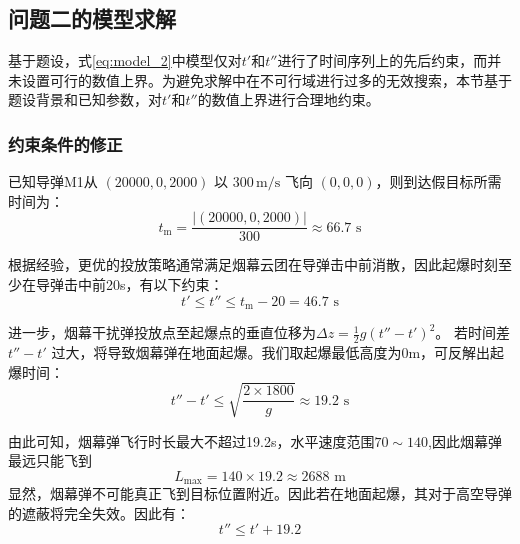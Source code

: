 \documentclass[withoutpreface,bwprint]{cumcmthesis}
\numberwithin{equation}{section} %
\numberwithin{figure}{section} %
\numberwithin{table}{section}  %
\begin{document}



\subsection{问题二的模型求解}

基于题设，式\ref{eq:model_2}中模型仅对$t'$和$t''$进行了时间序列上的先后约束，而并未设置可行的数值上界。为避免求解中在不可行域进行过多的无效搜索，本节基于题设背景和已知参数，对$t'$和$t''$的数值上界进行合理地约束。

\subsubsection{约束条件的修正}
已知导弹M1从 $(20000, 0, 2000)$ 以 $300 \, \text{m/s}$ 飞向 $(0, 0, 0)$，则到达假目标所需时间为：
\begin{equation}
    t_{\text{m}} = \frac{\lvert(20000, 0, 2000)\rvert}{300} \approx 66.7 \text{ s}
\end{equation}

根据经验，更优的投放策略通常满足烟幕云团在导弹击中前消散，因此起爆时刻至少在导弹击中前20s，有以下约束：
\begin{equation}
   t' \le t'' \le  t_{\text{m}} -20= 46.7 \text{ s}
\end{equation}

进一步，烟幕干扰弹投放点至起爆点的垂直位移为$\Delta z = \frac{1}{2} g (t'' - t')^2$。
若时间差$t'' - t'$ 过大，将导致烟幕弹在地面起爆。我们取起爆最低高度为$0\text{m}$，可反解出起爆时间：
\begin{equation}
    t'' - t' \le \sqrt{\frac{2\times1800}{g}} \approx 19.2 \text{ s}
\end{equation}

由此可知，烟幕弹飞行时长最大不超过19.2s，水平速度范围\( 70 \sim 140 \),因此烟幕弹最远只能飞到
\begin{equation}
L_{\max} = 140 \times 19.2 \approx 2688 \text{ m}
\end{equation}
显然，烟幕弹不可能真正飞到目标位置附近。因此若在地面起爆，其对于高空导弹的遮蔽将完全失效。因此有：
\begin{equation}
    t'' \le t' + 19.2
\end{equation}
\end{document}
